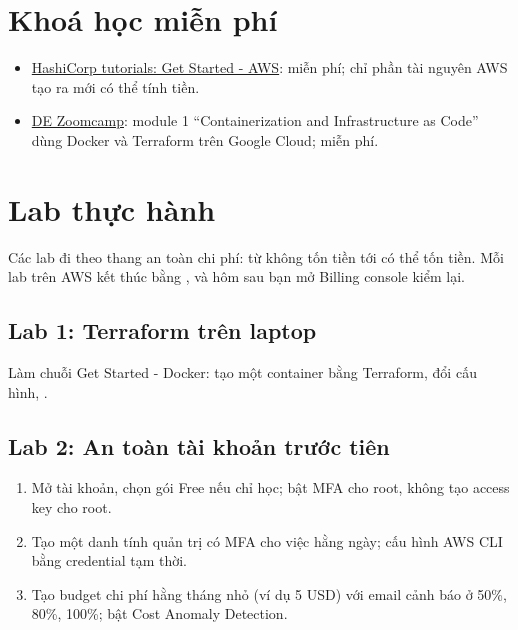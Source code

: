 \section{Khoá học miễn phí}
\begin{itemize}
  \item \href{https://developer.hashicorp.com/terraform/tutorials/aws-get-started}{HashiCorp tutorials: Get Started - AWS}: miễn phí; chỉ phần tài nguyên AWS tạo ra mới có thể tính tiền.
  \item \href{https://github.com/DataTalksClub/data-engineering-zoomcamp}{DE Zoomcamp}: module 1 ``Containerization and Infrastructure as Code'' dùng Docker và Terraform trên Google Cloud; miễn phí.
\end{itemize}

\section{Lab thực hành}

Các lab đi theo thang an toàn chi phí: từ không tốn tiền tới có thể tốn tiền. Mỗi lab trên AWS kết thúc bằng , và hôm sau bạn mở Billing console kiểm lại.

\subsection{Lab 1: Terraform trên laptop}
Làm chuỗi Get Started - Docker: tạo một container bằng Terraform, đổi cấu hình, .

\subsection{Lab 2: An toàn tài khoản trước tiên}
\begin{enumerate}
  \item Mở tài khoản, chọn gói Free nếu chỉ học; bật MFA cho root, không tạo access key cho root.
  \item Tạo một danh tính quản trị có MFA cho việc hằng ngày; cấu hình AWS CLI bằng credential tạm thời.
  \item Tạo budget chi phí hằng tháng nhỏ (ví dụ 5 USD) với email cảnh báo ở 50\%, 80\%, 100\%; bật Cost Anomaly Detection.
\end{enumerate}

